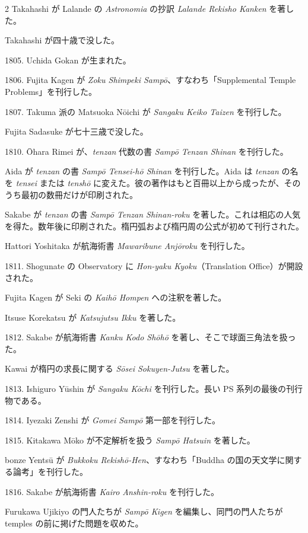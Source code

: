 \documentclass[11pt]{article}
\newcommand{\scanpage}[2]{\clearpage\setcounter{footnote}{0}\noindent{\footnotesize\color{gray}PDF #1 頁 · #2}\par\medskip}
\begin{document}
\scanpage{0201}{第23章年表、印刷頁187}
\begin{multicols}{2}\small
Takahashi が Lalande の \emph{Astronomia} の抄訳 \emph{Lalande Rekisho Kanken} を著した。

Takahashi が四十歳で没した。

1805. Uchida Gokan が生まれた。

1806. Fujita Kagen が \emph{Zoku Shimpeki Sampō}、すなわち「Supplemental Temple Problems」を刊行した。

1807. Takuma 派の Matsuoka Nōichi が \emph{Sangaku Keiko Taizen} を刊行した。

Fujita Sadasuke が七十三歳で没した。

1810. Ōhara Rimei が、\emph{tenzan} 代数の書 \emph{Sampō Tenzan Shinan} を刊行した。

Aida が \emph{tenzan} の書 \emph{Sampō Tensei-hō Shinan} を刊行した。Aida は \emph{tenzan} の名を \emph{tensei} または \emph{tenshō} に変えた。彼の著作はもと百冊以上から成ったが、そのうち最初の数冊だけが印刷された。

Sakabe が \emph{tenzan} の書 \emph{Sampō Tenzan Shinan-roku} を著した。これは相応の人気を得た。数年後に印刷された。楕円弧および楕円周の公式が初めて刊行された。

Hattori Yoshitaka が航海術書 \emph{Mawaribune Anjōroku} を刊行した。

1811. Shogunate の Observatory に \emph{Hon-yaku Kyoku}（Translation Office）が開設された。

Fujita Kagen が Seki の \emph{Kaihō Hompen} への注釈を著した。

Itsuse Korekatsu が \emph{Katsujutsu Ikku} を著した。

1812. Sakabe が航海術書 \emph{Kanku Kodo Shōhō} を著し、そこで球面三角法を扱った。

Kawai が楕円の求長に関する \emph{Sōsei Sokuyen-Jutsu} を著した。

1813. Ishiguro Yūshin が \emph{Sangaku Kōchi} を刊行した。長い PS 系列の最後の刊行物である。

1814. Iyezaki Zenshi が \emph{Gomei Sampō} 第一部を刊行した。

1815. Kitakawa Mōko が不定解析を扱う \emph{Sampō Hatsuin} を著した。

\columnbreak
bonze Yentsū が \emph{Bukkoku Rekishō-Hen}、すなわち「Buddha の国の天文学に関する論考」を刊行した。

1816. Sakabe が航海術書 \emph{Kairo Anshin-roku} を刊行した。

Furukawa Ujikiyo の門人たちが \emph{Sampō Kigen} を編集し、同門の門人たちが temples の前に掲げた問題を収めた。


\end{multicols}
\end{document}
